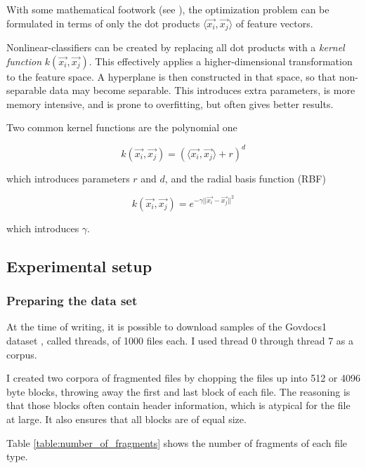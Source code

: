 With some mathematical footwork (see \cite{Burges1998}), the optimization
problem can be formulated in terms of only the dot products $\langle
\vec{x_{i}}, \vec{x_{j}} \rangle$ of feature vectors.

Nonlinear-classifiers can be created by replacing all dot products with
a \emph{kernel function} $k(\vec{x_{i}}, \vec{x_{j}})$. This effectively
applies a higher-dimensional transformation to the feature space.
A hyperplane is then constructed in that space, so that
non-separable data may become separable. This introduces extra parameters,
is more memory intensive, and is prone to overfitting, but often gives
better results.

Two common kernel functions are the polynomial one

$$ k(\vec{x_{i}}, \vec{x_{j}}) = ( \langle \vec{x_{i}}, \vec{x_{j}}
\rangle + r )^{d} $$

which introduces parameters $r$ and $d$, and the radial basis
function (RBF)

$$ k(\vec{x_{i}}, \vec{x_{j}}) = e^{-\gamma ||\vec{x_{i}}
- \vec{x_{j}}||^{2}} $$

which introduces $\gamma$.

\subsection{Experimental setup}

\subsubsection{Preparing the data set}

At the time of writing, it is possible to download samples of the Govdocs1
dataset \cite{Garfinkel2009}, called threads, of 1000 files each. I used
thread 0 through thread 7 as a corpus.

I created two corpora of fragmented files by chopping the files up into 512 or
4096 byte blocks, throwing away the first and last block of each file. The
     reasoning is that those blocks often contain header information, which is
     atypical for the file at large. It also ensures that all blocks are of
     equal size.

Table \ref{table:number_of_fragments} shows the number of fragments of each file type.


